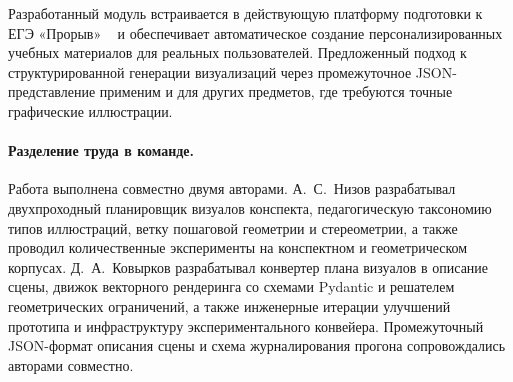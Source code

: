 Разработанный модуль встраивается в действующую платформу подготовки к ЕГЭ «Прорыв» ~\cite{Proriv} и обеспечивает автоматическое создание персонализированных учебных материалов для реальных пользователей. Предложенный подход к структурированной генерации визуализаций через промежуточное JSON-представление применим и для других предметов, где требуются точные графические иллюстрации.

\paragraph{Разделение труда в команде.} Работа выполнена совместно двумя авторами. А.~С.~Низов разрабатывал двухпроходный планировщик визуалов конспекта, педагогическую таксономию типов иллюстраций, ветку пошаговой геометрии и стереометрии, а также проводил количественные эксперименты на конспектном и геометрическом корпусах. Д.~А.~Ковырков разрабатывал конвертер плана визуалов в описание сцены, движок векторного рендеринга со схемами Pydantic и решателем геометрических ограничений, а также инженерные итерации улучшений прототипа и инфраструктуру экспериментального конвейера. Промежуточный JSON\nobreakdash-формат описания сцены и схема журналирования прогона сопровождались авторами совместно.
